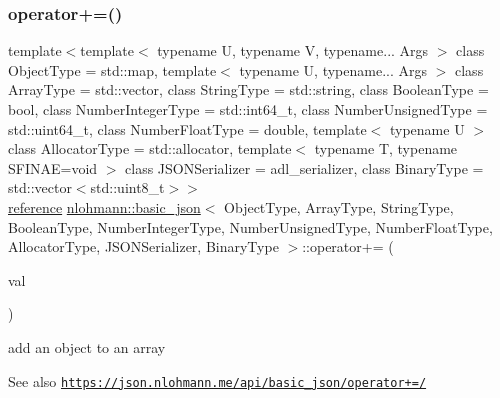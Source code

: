 \subsubsection{\texorpdfstring{operator+=()}{operator+=()}\hspace{0.1cm}{\footnotesize\ttfamily [2/4]}}
{\footnotesize\ttfamily template$<$template$<$ typename U, typename V, typename... Args $>$ class Object\+Type = std\+::map, template$<$ typename U, typename... Args $>$ class Array\+Type = std\+::vector, class String\+Type  = std\+::string, class Boolean\+Type  = bool, class Number\+Integer\+Type  = std\+::int64\+\_\+t, class Number\+Unsigned\+Type  = std\+::uint64\+\_\+t, class Number\+Float\+Type  = double, template$<$ typename U $>$ class Allocator\+Type = std\+::allocator, template$<$ typename T, typename S\+F\+I\+N\+A\+E=void $>$ class J\+S\+O\+N\+Serializer = adl\+\_\+serializer, class Binary\+Type  = std\+::vector$<$std\+::uint8\+\_\+t$>$$>$ \\
\hyperlink{classnlohmann_1_1basic__json_a220ae98554a76205fb7f8822d36b2d5a}{reference} \hyperlink{classnlohmann_1_1basic__json}{nlohmann\+::basic\+\_\+json}$<$ Object\+Type, Array\+Type, String\+Type, Boolean\+Type, Number\+Integer\+Type, Number\+Unsigned\+Type, Number\+Float\+Type, Allocator\+Type, J\+S\+O\+N\+Serializer, Binary\+Type $>$\+::operator+= (\begin{DoxyParamCaption}\item[{const \hyperlink{classnlohmann_1_1basic__json}{basic\+\_\+json}$<$ Object\+Type, Array\+Type, String\+Type, Boolean\+Type, Number\+Integer\+Type, Number\+Unsigned\+Type, Number\+Float\+Type, Allocator\+Type, J\+S\+O\+N\+Serializer, Binary\+Type $>$ \&}]{val }\end{DoxyParamCaption})\hspace{0.3cm}{\ttfamily [inline]}}



add an object to an array 

\begin{DoxySeeAlso}{See also}
\href{https://json.nlohmann.me/api/basic_json/operator+=/}{\tt https\+://json.\+nlohmann.\+me/api/basic\+\_\+json/operator+=/} 
\end{DoxySeeAlso}
\mbox{\label{classnlohmann_1_1basic__json_ae300819781bce2193369609457f70f30}} 
